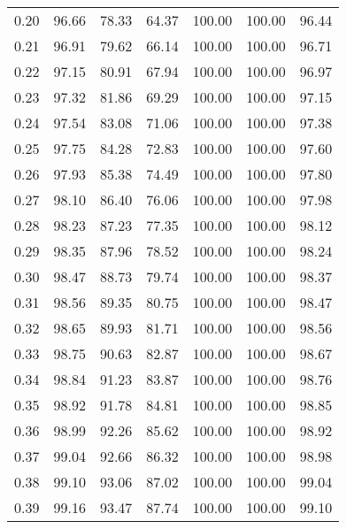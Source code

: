 \begin{tabular}{|c|c|c|c|c|c|c|}
      0.20 &     96.66 &     78.33 &      64.37 &  100.00 &     100.00 &         96.44 \\
      0.21 &     96.91 &     79.62 &      66.14 &  100.00 &     100.00 &         96.71 \\
      0.22 &     97.15 &     80.91 &      67.94 &  100.00 &     100.00 &         96.97 \\
      0.23 &     97.32 &     81.86 &      69.29 &  100.00 &     100.00 &         97.15 \\
      0.24 &     97.54 &     83.08 &      71.06 &  100.00 &     100.00 &         97.38 \\
      0.25 &     97.75 &     84.28 &      72.83 &  100.00 &     100.00 &         97.60 \\
      0.26 &     97.93 &     85.38 &      74.49 &  100.00 &     100.00 &         97.80 \\
      0.27 &     98.10 &     86.40 &      76.06 &  100.00 &     100.00 &         97.98 \\
      0.28 &     98.23 &     87.23 &      77.35 &  100.00 &     100.00 &         98.12 \\
      0.29 &     98.35 &     87.96 &      78.52 &  100.00 &     100.00 &         98.24 \\
      0.30 &     98.47 &     88.73 &      79.74 &  100.00 &     100.00 &         98.37 \\
      0.31 &     98.56 &     89.35 &      80.75 &  100.00 &     100.00 &         98.47 \\
      0.32 &     98.65 &     89.93 &      81.71 &  100.00 &     100.00 &         98.56 \\
      0.33 &     98.75 &     90.63 &      82.87 &  100.00 &     100.00 &         98.67 \\
      0.34 &     98.84 &     91.23 &      83.87 &  100.00 &     100.00 &         98.76 \\
      0.35 &     98.92 &     91.78 &      84.81 &  100.00 &     100.00 &         98.85 \\
      0.36 &     98.99 &     92.26 &      85.62 &  100.00 &     100.00 &         98.92 \\
      0.37 &     99.04 &     92.66 &      86.32 &  100.00 &     100.00 &         98.98 \\
      0.38 &     99.10 &     93.06 &      87.02 &  100.00 &     100.00 &         99.04 \\
      0.39 &     99.16 &     93.47 &      87.74 &  100.00 &     100.00 &         99.10 \\

\end{tabular}
